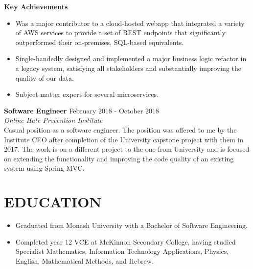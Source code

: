 \documentclass[margin, 11pt]{res} %
\begin{document}
\begin{resume}
\begin{itemize}
\end{itemize} 

\textbf{Key Achievements}

\begin{itemize}

\item Was a major contributor to a cloud-hosted webapp that integrated a variety of AWS services to provide a set of REST endpoints that significantly outperformed their on-premises, SQL-based equivalents.
\item Single-handedly designed and implemented a major business logic refactor in a legacy system, satisfying all stakeholders and substantially improving the quality of our data. 
\item Subject matter expert for several microservices.


\end{itemize}


\textbf{Software Engineer} \hfill February 2018 - October 2018 \\
{\sl Online Hate Prevention Institute}
\vspace{15pt}\\
Casual position as a software engineer. The position was offered to me by the Institute CEO after completion of the University capstone project with them in 2017. The work is on a different project to the one from University and is focused on extending the functionality and improving the code quality of an existing system using Spring MVC.





\section{EDUCATION}

\begin{itemize}

\item Graduated from  Monash University with a Bachelor of Software Engineering.
\item Completed year 12 VCE at McKinnon Secondary College, having studied Specialist  Mathematics, Information Technology Applications, Physics, English, Mathematical Methods, and Hebrew.

\end{itemize}


\end{resume}
\end{document}
